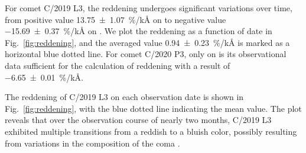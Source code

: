 For comet C/2019 L3, the reddening undergoes significant variations over time, from positive value {\qty{13.75 +- 1.07}{\percent/\kilo\angstrom}} on  to negative value {\qty{-15.69 +- 0.37}{\percent/\kilo\angstrom}} on . We plot the reddening as a function of date in Fig.~\ref{fig:reddening}, and the averaged value {\qty{0.94 +- 0.23}{\percent/\kilo\angstrom}} is marked as a horizontal blue dotted line. For comet C/2020 P3, only on  is its observational data sufficient for the calculation of reddening with a result of {\qty{-6.65 +- 0.01}{\percent/\kilo\angstrom}}. 

The reddening of C/2019 L3 on each observation date is shown in Fig.~\ref{fig:reddening}, with the blue dotted line indicating the mean value. The plot reveals that over the observation course of nearly two months, C/2019 L3 exhibited multiple transitions from a reddish to a bluish color, possibly resulting from variations in the composition of the coma \citep{ivanova_colour_2017}. 

